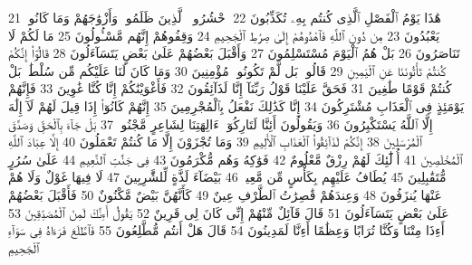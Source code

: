 {\tiny\colorbox{cl_aya}{21}} هَٰذَا يَوْمُ ٱلْفَصْلِ ٱلَّذِى كُنتُم بِهِۦ تُكَذِّبُونَ
{\tiny\colorbox{cl_aya}{22}} ٱحْشُرُوا۟ ٱلَّذِينَ ظَلَمُوا۟ وَأَزْوَٰجَهُمْ وَمَا كَانُوا۟ يَعْبُدُونَ
{\tiny\colorbox{cl_aya}{23}} مِن دُونِ ٱللَّهِ فَٱهْدُوهُمْ إِلَىٰ صِرَٰطِ ٱلْجَحِيمِ
{\tiny\colorbox{cl_aya}{24}} وَقِفُوهُمْ إِنَّهُم مَّسْـُٔولُونَ
{\tiny\colorbox{cl_aya}{25}} مَا لَكُمْ لَا تَنَاصَرُونَ
{\tiny\colorbox{cl_aya}{26}} بَلْ هُمُ ٱلْيَوْمَ مُسْتَسْلِمُونَ
{\tiny\colorbox{cl_aya}{27}} وَأَقْبَلَ بَعْضُهُمْ عَلَىٰ بَعْضٍ يَتَسَآءَلُونَ
{\tiny\colorbox{cl_aya}{28}} قَالُوٓا۟ إِنَّكُمْ كُنتُمْ تَأْتُونَنَا عَنِ ٱلْيَمِينِ
{\tiny\colorbox{cl_aya}{29}} قَالُوا۟ بَل لَّمْ تَكُونُوا۟ مُؤْمِنِينَ
{\tiny\colorbox{cl_aya}{30}} وَمَا كَانَ لَنَا عَلَيْكُم مِّن سُلْطَٰنٍۭ بَلْ كُنتُمْ قَوْمًا طَٰغِينَ
{\tiny\colorbox{cl_aya}{31}} فَحَقَّ عَلَيْنَا قَوْلُ رَبِّنَآ إِنَّا لَذَآئِقُونَ
{\tiny\colorbox{cl_aya}{32}} فَأَغْوَيْنَٰكُمْ إِنَّا كُنَّا غَٰوِينَ
{\tiny\colorbox{cl_aya}{33}} فَإِنَّهُمْ يَوْمَئِذٍ فِى ٱلْعَذَابِ مُشْتَرِكُونَ
{\tiny\colorbox{cl_aya}{34}} إِنَّا كَذَٰلِكَ نَفْعَلُ بِٱلْمُجْرِمِينَ
{\tiny\colorbox{cl_aya}{35}} إِنَّهُمْ كَانُوٓا۟ إِذَا قِيلَ لَهُمْ لَآ إِلَٰهَ إِلَّا ٱللَّهُ يَسْتَكْبِرُونَ
{\tiny\colorbox{cl_aya}{36}} وَيَقُولُونَ أَئِنَّا لَتَارِكُوٓا۟ ءَالِهَتِنَا لِشَاعِرٍ مَّجْنُونٍۭ
{\tiny\colorbox{cl_aya}{37}} بَلْ جَآءَ بِٱلْحَقِّ وَصَدَّقَ ٱلْمُرْسَلِينَ
{\tiny\colorbox{cl_aya}{38}} إِنَّكُمْ لَذَآئِقُوا۟ ٱلْعَذَابِ ٱلْأَلِيمِ
{\tiny\colorbox{cl_aya}{39}} وَمَا تُجْزَوْنَ إِلَّا مَا كُنتُمْ تَعْمَلُونَ
{\tiny\colorbox{cl_aya}{40}} إِلَّا عِبَادَ ٱللَّهِ ٱلْمُخْلَصِينَ
{\tiny\colorbox{cl_aya}{41}} أُو۟لَٰٓئِكَ لَهُمْ رِزْقٌ مَّعْلُومٌ
{\tiny\colorbox{cl_aya}{42}} فَوَٰكِهُ وَهُم مُّكْرَمُونَ
{\tiny\colorbox{cl_aya}{43}} فِى جَنَّٰتِ ٱلنَّعِيمِ
{\tiny\colorbox{cl_aya}{44}} عَلَىٰ سُرُرٍ مُّتَقَٰبِلِينَ
{\tiny\colorbox{cl_aya}{45}} يُطَافُ عَلَيْهِم بِكَأْسٍ مِّن مَّعِينٍۭ
{\tiny\colorbox{cl_aya}{46}} بَيْضَآءَ لَذَّةٍ لِّلشَّٰرِبِينَ
{\tiny\colorbox{cl_aya}{47}} لَا فِيهَا غَوْلٌ وَلَا هُمْ عَنْهَا يُنزَفُونَ
{\tiny\colorbox{cl_aya}{48}} وَعِندَهُمْ قَٰصِرَٰتُ ٱلطَّرْفِ عِينٌ
{\tiny\colorbox{cl_aya}{49}} كَأَنَّهُنَّ بَيْضٌ مَّكْنُونٌ
{\tiny\colorbox{cl_aya}{50}} فَأَقْبَلَ بَعْضُهُمْ عَلَىٰ بَعْضٍ يَتَسَآءَلُونَ
{\tiny\colorbox{cl_aya}{51}} قَالَ قَآئِلٌ مِّنْهُمْ إِنِّى كَانَ لِى قَرِينٌ
{\tiny\colorbox{cl_aya}{52}} يَقُولُ أَءِنَّكَ لَمِنَ ٱلْمُصَدِّقِينَ
{\tiny\colorbox{cl_aya}{53}} أَءِذَا مِتْنَا وَكُنَّا تُرَابًا وَعِظَٰمًا أَءِنَّا لَمَدِينُونَ
{\tiny\colorbox{cl_aya}{54}} قَالَ هَلْ أَنتُم مُّطَّلِعُونَ
{\tiny\colorbox{cl_aya}{55}} فَٱطَّلَعَ فَرَءَاهُ فِى سَوَآءِ ٱلْجَحِيمِ
